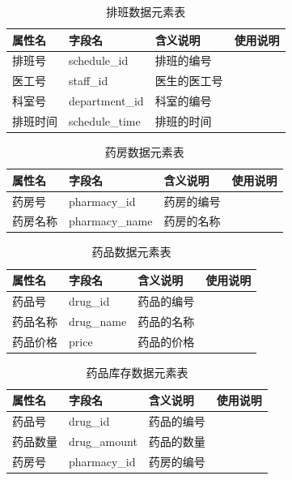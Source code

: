 \documentclass{article}
\begin{document}
\begin{table}[H]
    \centering
    \begin{tabularx}{\textwidth}{|p{2.2cm}|p{3.3cm}|p{4.7cm}|p{5cm}|}
    \toprule
    \textbf{属性名} & \textbf{字段名} & \textbf{含义说明} & \textbf{使用说明} \\ \midrule
    排班号 & schedule\_id & 排班的编号 &  \\ \midrule
    医工号 & staff\_id & 医生的医工号 &  \\ \midrule
    科室号 & department\_id & 科室的编号 &  \\ \midrule
    排班时间 & schedule\_time & 排班的时间 &  \\ \bottomrule
    \end{tabularx}
    \caption{排班数据元素表}
    \label{tab:schedule_elements}
\end{table}

\begin{table}[H]
    \centering
    \begin{tabularx}{\textwidth}{|p{2.2cm}|p{3.3cm}|p{4.7cm}|p{5cm}|}
    \toprule
    \textbf{属性名} & \textbf{字段名} & \textbf{含义说明} & \textbf{使用说明} \\ \midrule
    药房号 & pharmacy\_id & 药房的编号 &  \\ \midrule
    药房名称 & pharmacy\_name & 药房的名称 &  \\ \bottomrule
    \end{tabularx}
    \caption{药房数据元素表}
    \label{tab:pharmacy_elements}
\end{table}

\begin{table}[H]
    \centering
    \begin{tabularx}{\textwidth}{|p{2.2cm}|p{3.3cm}|p{4.7cm}|p{5cm}|}
    \toprule
    \textbf{属性名} & \textbf{字段名} & \textbf{含义说明} & \textbf{使用说明} \\ \midrule
    药品号 & drug\_id & 药品的编号 &  \\ \midrule
    药品名称 & drug\_name & 药品的名称 &  \\ \midrule
    药品价格 & price & 药品的价格 &  \\ \bottomrule
    \end{tabularx}
    \caption{药品数据元素表}
    \label{tab:drug_elements}
\end{table}

\begin{table}[H]
    \centering
    \begin{tabularx}{\textwidth}{|p{2.2cm}|p{3.3cm}|p{4.7cm}|p{5cm}|}
    \toprule
    \textbf{属性名} & \textbf{字段名} & \textbf{含义说明} & \textbf{使用说明} \\ \midrule
    药品号 & drug\_id & 药品的编号 &  \\ \midrule
    药品数量 & drug\_amount & 药品的数量 &  \\ \midrule
    药房号 & pharmacy\_id & 药房的编号 &  \\ \bottomrule
    \end{tabularx}
    \caption{药品库存数据元素表}
    \label{tab:drug_storage_elements}
\end{table}
\end{document}
